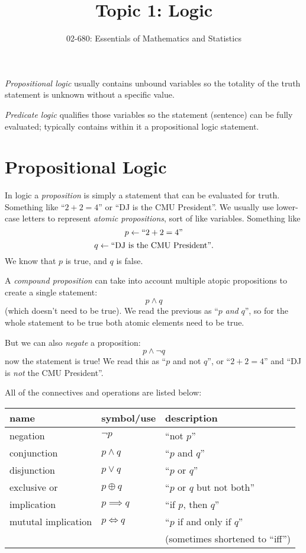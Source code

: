 \documentclass[11pt, oneside]{article}   	%
\title{Topic 1:  Logic}
\author{02-680: Essentials of Mathematics and Statistics}
\begin{document}
\maketitle

\emph{Propositional logic} usually contains unbound variables so the totality of the truth statement is unknown without a specific value. 

\emph{Predicate logic} qualifies those variables so the statement (sentence) can be fully evaluated; typically contains within it a propositional logic statement. 

\section{Propositional Logic}
In logic a \emph{proposition} is simply a statement that can be evaluated for truth. 
Something like ``$2+2=4$'' or ``DJ is the CMU President''. 
We usually use lower-case letters to represent \emph{atomic propositions}, sort of like variables. 
Something like 
\[ p \leftarrow \textnormal{``}2+2=4\textnormal{''}\]
\[ q \leftarrow \textnormal{``DJ is the CMU President''}.\]
We know that $p$ is true, and $q$ is false. 


A \emph{compound proposition} can take into account multiple atopic propositions to create a single statement: 
\[ p \wedge q \]
(which doesn't need to be true). 
We read the previous as ``$p$ \textit{and} $q$'', 
so for the whole statement to be true both atomic elements need to be true. 
 
But we can also \textit{negate} a proposition: 
\[ p \wedge \neg q \]
now the statement is true! 
We read this as ``$p$ and not $q$'', 
or  ``$2+2=4$'' and  ``DJ is \emph{not} the CMU President''.

All of the connectives and operations are listed below: 
\begin{center}
\begin{tabular}{lll}
name 		& symbol/use 		& description\\
\hline 
\hline
negation			& $\neg p$		& ``not $p$''\\
\hline
conjunction		& $p \wedge q$		& ``$p$ and $q$''\\
disjunction		& $p \vee q$		& ``$p$ or $q$''\\
exclusive or		& $p \oplus q$		& ``$p$ or $q$ but not both''\\
\hline
implication		& $p \implies q$	& ``if $p$, then $q$''\\
mututal implication 	& $p \iff q$		& ``$p$ if and only if $q$'' \\
				&				& \hspace{3em}(sometimes shortened to ``iff'')\\
\hline
\end{tabular}
\end{center}
\end{document}

